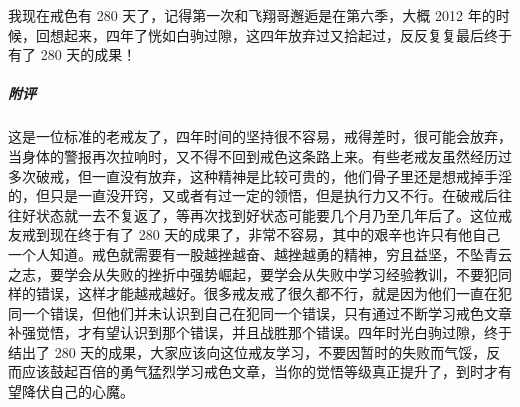 \begin{case}
    我现在戒色有 280 天了，记得第一次和飞翔哥邂逅是在第六季，大概 2012 年的时候，回想起来，四年了恍如白驹过隙，这四年放弃过又拾起过，反反复复最后终于有了 280 天的成果！
    \subparagraph{附评} 这是一位标准的老戒友了，四年时间的坚持很不容易，戒得差时，很可能会放弃，当身体的警报再次拉响时，又不得不回到戒色这条路上来。有些老戒友虽然经历过多次破戒，但一直没有放弃，这种精神是比较可贵的，他们骨子里还是想戒掉手淫的，但只是一直没开窍，又或者有过一定的领悟，但是执行力又不行。在破戒后往往好状态就一去不复返了，等再次找到好状态可能要几个月乃至几年后了。这位戒友戒到现在终于有了 280 天的成果了，非常不容易，其中的艰辛也许只有他自己一个人知道。戒色就需要有一股越挫越奋、越挫越勇的精神，穷且益坚，不坠青云之志，要学会从失败的挫折中强势崛起，要学会从失败中学习经验教训，不要犯同样的错误，这样才能越戒越好。很多戒友戒了很久都不行，就是因为他们一直在犯同一个错误，但他们并未认识到自己在犯同一个错误，只有通过不断学习戒色文章补强觉悟，才有望认识到那个错误，并且战胜那个错误。四年时光白驹过隙，终于结出了 280 天的成果，大家应该向这位戒友学习，不要因暂时的失败而气馁，反而应该鼓起百倍的勇气猛烈学习戒色文章，当你的觉悟等级真正提升了，到时才有望降伏自己的心魔。
\end{case}

